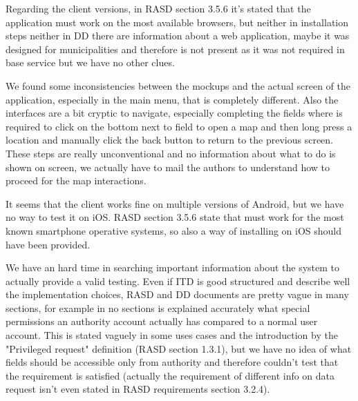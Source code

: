 Regarding the client versions, in RASD section 3.5.6 it's stated that the application must work on the most available browsers, but neither in installation steps neither in DD there are information about a web application, maybe it was designed for municipalities and therefore is not present as it was not required in base service but we have no other clues.

We found some inconsistencies between the mockups and the actual screen of the application, especially in the main menu, that is completely different. Also the interfaces are a bit cryptic to navigate, especially completing the fields where is required to click on the bottom next to field to open a map and then long press a location and manually click the back button to return to the previous screen. These steps are really unconventional and no information about what to do is shown on screen, we actually have to mail the authors to understand how to proceed for the map interactions.

It seems that the client works fine on multiple versions of Android, but we have no way to test it on iOS. RASD section 3.5.6 state that must work for the most known smartphone operative systems, so also a way of installing on iOS should have been provided.

We have an hard time in searching important information about the system to actually provide a valid testing. Even if ITD is good structured and describe well the implementation choices, RASD and DD documents are pretty vague in many sections, for example in no sections is explained accurately what special permissions an authority account actually has compared to a normal user account. This is stated vaguely in some uses cases and the introduction by the "Privileged request" definition (RASD section 1.3.1), but we have no idea of what fields should be accessible only from authority and therefore couldn't test that the requirement is satisfied (actually the requirement of different info on data request isn't even stated in RASD requirements section 3.2.4).